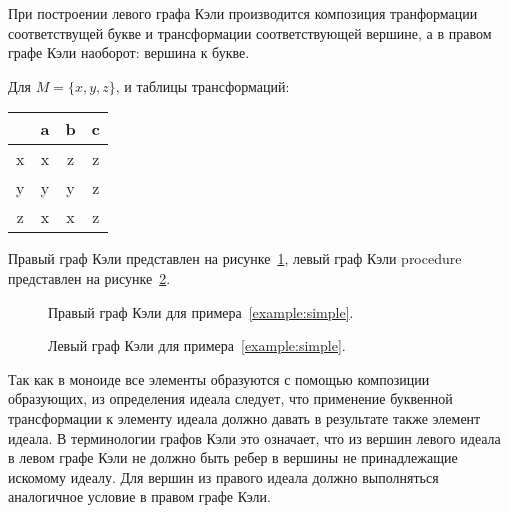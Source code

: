 \documentclass[14pt, russian]{scrartcl}
\begin{document}
При построении левого графа Кэли производится композиция транформации
соответствущей букве и трансформации соответствующей вершине, а в правом графе
Кэли наоборот: вершина к букве.

\begin{Example}\label{example:simple}
  Для $M = \{x, y, z\}$, и таблицы трансформаций:

  \begin{table}[htb]
    \centering\begin{tabular}{c|ccc}
      & a & b & c \\
      \hline
      x & x & z & z \\
      y & y & y & z \\
      z & x & x & z
    \end{tabular}
  \end{table}

  Правый граф Кэли представлен на рисунке~\ref{fig:example1}, левый граф Кэли
procedure  представлен на рисунке~\ref{fig:example_left}.

  \begin{figure}[!htb]
    \centering
    \begin{minipage}[t]{\textwidth}
      \centering
      
    \end{minipage}
    \caption{Правый граф Кэли для примера~\ref{example:simple}.}
    \label{fig:example1}
  \end{figure}

  \begin{figure}[!htb]
    \centering
    \begin{minipage}[t]{\textwidth}
      \centering
      
    \end{minipage}
    \caption{Левый граф Кэли для примера~\ref{example:simple}.}
    \label{fig:example_left}
  \end{figure}
\end{Example}


Так как в моноиде все элементы образуются с помощью композиции образующих, из
определения идеала следует, что применение буквенной трансформации к элементу
идеала должно давать в результате также элемент идеала. В терминологии графов
Кэли это означает, что из вершин левого идеала в левом графе Кэли не должно быть
ребер в вершины не принадлежащие искомому идеалу. Для вершин из правого идеала
должно выполняться аналогичное условие в правом графе Кэли.
\end{document}
